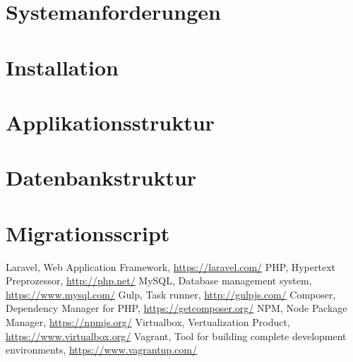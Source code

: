 \documentclass[12pt, letterpaper]{report}
\begin{document}
    \chapter{Systemanforderungen}
    

    \chapter{Installation}
    

    \chapter{Applikationsstruktur}
    

    \chapter{Datenbankstruktur}
    

    \chapter{Migrationsscript}
    

    \clearpage

    \begin{thebibliography}{500} %
        Laravel, Web Application Framework, \url{https://laravel.com/}
        PHP, Hypertext Preprozessor, \url{http://php.net/}
        MySQL, Database management system, \url{https://www.mysql.com/}
        Gulp, Task runner, \url{http://gulpjs.com/}
        Composer, Dependency Manager for PHP, \url{https://getcomposer.org/}
        NPM, Node Package Manager, \url{https://npmjs.org/}
        Virtualbox, Vertualization Product, \url{https://www.virtualbox.org/}
        Vagrant, Tool for building complete development environments, \url{https://www.vagrantup.com/}
    \end{thebibliography}
    \lstlistoflistings
    \listoffigures
\end{document}
